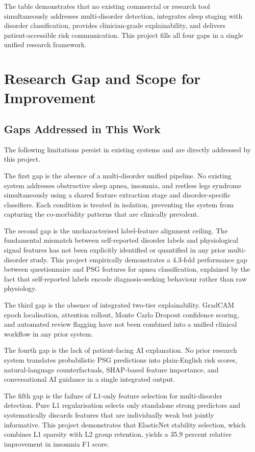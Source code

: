 The table demonstrates that no existing commercial or research tool simultaneously addresses multi-disorder detection, integrates sleep staging with disorder classification, provides clinician-grade explainability, and delivers patient-accessible risk communication. This project fills all four gaps in a single unified research framework.

\section{Research Gap and Scope for Improvement}

\subsection{Gaps Addressed in This Work}

The following limitations persist in existing systems and are directly addressed by this project.

The first gap is the absence of a multi-disorder unified pipeline. No existing system addresses obstructive sleep apnea, insomnia, and restless legs syndrome simultaneously using a shared feature extraction stage and disorder-specific classifiers. Each condition is treated in isolation, preventing the system from capturing the co-morbidity patterns that are clinically prevalent.

The second gap is the uncharacterised label-feature alignment ceiling. The fundamental mismatch between self-reported disorder labels and physiological signal features has not been explicitly identified or quantified in any prior multi-disorder study. This project empirically demonstrates a 4.3-fold performance gap between questionnaire and PSG features for apnea classification, explained by the fact that self-reported labels encode diagnosis-seeking behaviour rather than raw physiology.

The third gap is the absence of integrated two-tier explainability. GradCAM epoch localisation, attention rollout, Monte Carlo Dropout confidence scoring, and automated review flagging have not been combined into a unified clinical workflow in any prior system.

The fourth gap is the lack of patient-facing AI explanation. No prior research system translates probabilistic PSG predictions into plain-English risk scores, natural-language counterfactuals, SHAP-based feature importance, and conversational AI guidance in a single integrated output.

The fifth gap is the failure of L1-only feature selection for multi-disorder detection. Pure L1 regularisation selects only standalone strong predictors and systematically discards features that are individually weak but jointly informative. This project demonstrates that ElasticNet stability selection, which combines L1 sparsity with L2 group retention, yields a 35.9 percent relative improvement in insomnia F1 score.

